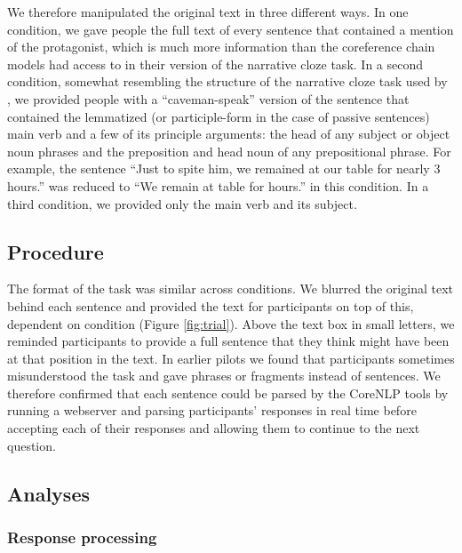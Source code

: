 \documentclass[10pt,a4paper]{article}
\begin{document}
We therefore manipulated the original text in three different ways.
In one condition, we gave people the full text of every sentence that contained a mention of the protagonist, which is much more information than the coreference chain models had access to in their version of the narrative cloze task. In a second condition, somewhat resembling the structure of the narrative cloze task used by , we provided people with a ``caveman-speak'' version of the sentence that contained the lemmatized (or participle-form in the case of passive sentences) main verb and a few of its principle arguments: the head of any subject or object noun phrases and the preposition and head noun of any prepositional phrase. For example, the sentence ``Just to spite him, we remained at our table for nearly 3 hours.'' was reduced to ``We remain at table for hours.'' in this condition.
In a third condition, we provided only the main verb and its subject.

\subsection{Procedure}

The format of the task was similar across conditions. We blurred the original text behind each sentence and provided the text for participants on top of this, dependent on condition (Figure \ref{fig:trial}). Above the text box in small letters, we reminded participants to provide a full sentence that they think might have been at that position in the text. In earlier pilots we found that participants sometimes misunderstood the task and gave phrases or fragments instead of sentences. We therefore confirmed that each sentence could be parsed by the CoreNLP tools \cite{corenlp} by running a webserver and parsing participants' responses in real time before accepting each of their responses and allowing them to continue to the next question.

\subsection{Analyses}

\subsubsection{Response processing}
\end{document}
